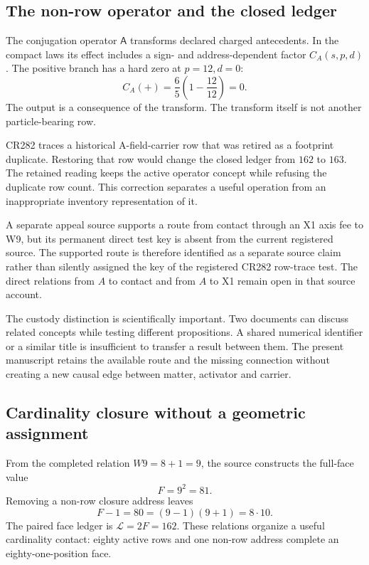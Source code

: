 \subsection{The non-row operator and the closed ledger}

The conjugation operator $\mathsf A$ transforms declared charged antecedents. In the compact laws its effect includes a sign- and address-dependent factor $C_A(s,p,d)$. The positive branch has a hard zero at $p=12,d=0$:
\begin{equation}
C_A(+)=\frac65\left(1-\frac{12}{12}\right)=0.
\end{equation}
The output is a consequence of the transform. The transform itself is not another particle-bearing row.

CR282 traces a historical A-field-carrier row that was retired as a footprint duplicate. Restoring that row would change the closed ledger from $162$ to $163$. The retained reading keeps the active operator concept while refusing the duplicate row count. This correction separates a useful operation from an inappropriate inventory representation of it.\cite{viireview}

A separate appeal source supports a route from contact through an X1 axis fee to W9, but its permanent direct test key is absent from the current registered source. The supported route is therefore identified as a separate source claim rather than silently assigned the key of the registered CR282 row-trace test. The direct relations from $A$ to contact and from $A$ to X1 remain open in that source account.

The custody distinction is scientifically important. Two documents can discuss related concepts while testing different propositions. A shared numerical identifier or a similar title is insufficient to transfer a result between them. The present manuscript retains the available route and the missing connection without creating a new causal edge between matter, activator and carrier.

\subsection{Cardinality closure without a geometric assignment}

From the completed relation $W9=8+1=9$, the source constructs the full-face value
\begin{equation}
F=9^2=81.
\end{equation}
Removing a non-row closure address leaves
\begin{equation}
F-1=80=(9-1)(9+1)=8\cdot10.
\end{equation}
The paired face ledger is $\mathcal L=2F=162$. These relations organize a useful cardinality contact: eighty active rows and one non-row address complete an eighty-one-position face.

